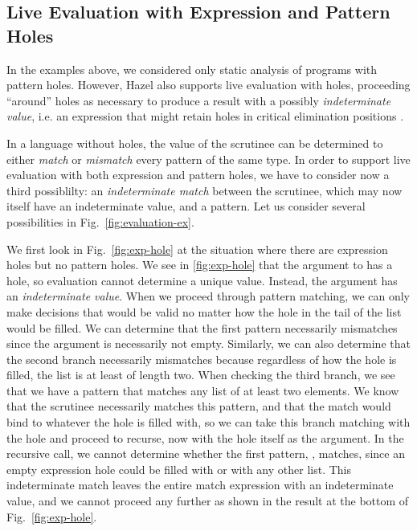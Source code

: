 \subsection{Live Evaluation with Expression and Pattern Holes}
\label{sec:hazel-live-eval}
In the examples above, we considered only {static analysis} of programs with pattern holes.
However, Hazel also supports live evaluation with holes, proceeding ``around'' holes
as necessary to produce a result with a possibly \emph{indeterminate value}, i.e. an expression that might retain holes in critical elimination positions \cite{DBLP:journals/pacmpl/OmarVCH19}. %

In a language without holes, the value of the scrutinee can be determined to either \emph{match} or \emph{mismatch} every pattern of the same type.
In order to support live evaluation with both expression and pattern holes, we have to consider now a third possiblilty: an \emph{indeterminate match} between the scrutinee, which may now itself have an indeterminate value, and a pattern. Let us consider several possibilities in Fig.~\ref{fig:evaluation-ex}. 

We first look in Fig.~\ref{fig:exp-hole} at the situation where there are expression holes but no pattern holes. 
We see in \autoref{fig:exp-hole} that the argument to  has a hole, so evaluation cannot determine a unique value. Instead,
the argument has an \emph{indeterminate value}. 
When we proceed through pattern matching, we can only make decisions that would be valid no matter how the hole in the tail of the list
would be filled. 
We can determine that the first pattern necessarily mismatches since the argument is necessarily not empty. 
Similarly, we can also determine that the second branch necessarily mismatches because regardless of how the hole is filled, the list is at least of length two. 
When checking the third branch, we see that we have a pattern that matches any list of at least two elements.
We know that the scrutinee necessarily matches this pattern, and that the match would bind  to whatever the hole is filled with, so we can take this branch matching  with the hole and proceed to recurse, now with the hole itself as the argument. In the recursive call, we cannot determine whether the first pattern, \li{[]}, matches, since an empty expression hole could be filled with \li{[]} or with any other list. This indeterminate match leaves the entire match expression with an indeterminate value, and we cannot proceed any further as shown in the 
result at the bottom of Fig.~\ref{fig:exp-hole}.

